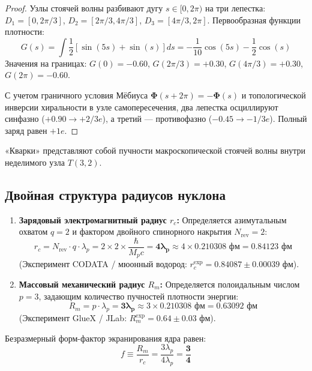 \documentclass[12pt,a4paper]{article}
\begin{document}
	\begin{proof}
		Узлы стоячей волны разбивают дугу $s \in [0, 2\pi)$ на три лепестка: $D_1 = [0, 2\pi/3]$, $D_2 = [2\pi/3, 4\pi/3]$, $D_3 = [4\pi/3, 2\pi]$. Первообразная функции плотности:
		\begin{equation}
			G(s) = \int \frac{1}{2} [\sin(5s) + \sin(s)] ds = -\frac{1}{10}\cos(5s) - \frac{1}{2}\cos(s)
		\end{equation}
		Значения на границах: $G(0) = -0.60$, $G(2\pi/3) = +0.30$, $G(4\pi/3) = +0.30$, $G(2\pi) = -0.60$.
		
		С учетом граничного условия Мёбиуса $\boldsymbol{\Phi}(s+2\pi) = -\boldsymbol{\Phi}(s)$ и топологической инверсии хиральности в узле самопересечения, два лепестка осциллируют синфазно ($+0.90 \to +2/3e$), а третий — противофазно ($-0.45 \to -1/3e$). Полный заряд равен $+1e$.
	\end{proof}
	
	«Кварки» представляют собой пучности макроскопической стоячей волны внутри неделимого узла $T(3,2)$.
	
	\subsection{Двойная структура радиусов нуклона}
	\begin{enumerate}
		\item \textbf{Зарядовый электромагнитный радиус $r_c$:} Определяется азимутальным охватом $q=2$ и фактором двойного спинорного накрытия $N_{\text{rev}} = 2$:
		\begin{equation}
			r_c = N_{\text{rev}} \cdot q \cdot \lambda_p = 2 \times 2 \times \frac{\hbar}{M_p c} = \mathbf{4 \lambda_p} \approx 4 \times 0.210308 \text{ фм} = \mathbf{0.84123 \text{ фм}}
		\end{equation}
		(Эксперимент CODATA / мюонный водород: $r_c^{\text{exp}} = 0.84087 \pm 0.00039$ фм).
		
		\item \textbf{Массовый механический радиус $R_m$:} Определяется полоидальным числом $p=3$, задающим количество пучностей плотности энергии:
		\begin{equation}
			R_m = p \cdot \lambda_p = \mathbf{3 \lambda_p} \approx 3 \times 0.210308 \text{ фм} = \mathbf{0.63092 \text{ фм}}
		\end{equation}
		(Эксперимент GlueX / JLab: $R_m^{\text{exp}} = 0.64 \pm 0.03$ фм).
	\end{enumerate}
	Безразмерный форм-фактор экранирования ядра равен:
	\begin{equation}
		f \equiv \frac{R_m}{r_c} = \frac{3 \lambda_p}{4 \lambda_p} = \mathbf{\frac{3}{4}}
	\end{equation}
	
\end{document}
